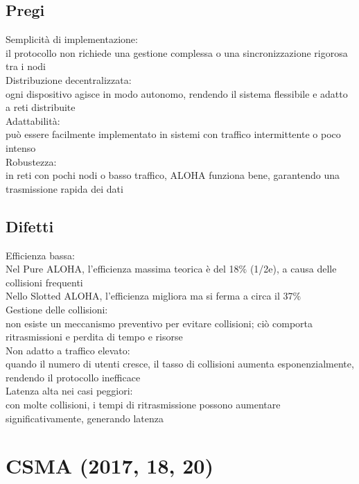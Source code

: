 \documentclass[10pt,oneside,a4paper]{article}
\begin{document}
\subsection{Pregi}
Semplicità di implementazione:\\
il protocollo non richiede una gestione complessa o una sincronizzazione rigorosa tra i nodi\\
Distribuzione decentralizzata:\\
ogni dispositivo agisce in modo autonomo, rendendo il sistema flessibile e adatto a reti distribuite\\
Adattabilità:\\
può essere facilmente implementato in sistemi con traffico intermittente o poco intenso\\
Robustezza:\\
in reti con pochi nodi o basso traffico, ALOHA funziona bene, garantendo una trasmissione rapida dei dati
\subsection{Difetti}
Efficienza bassa:\\
Nel Pure ALOHA, l'efficienza massima teorica è del 18$\%$ (1/2e), a causa delle collisioni frequenti\\
Nello Slotted ALOHA, l'efficienza migliora ma si ferma a circa il 37$\%$\\
Gestione delle collisioni:\\
non esiste un meccanismo preventivo per evitare collisioni; ciò comporta ritrasmissioni e perdita di tempo e risorse\\
Non adatto a traffico elevato:\\
quando il numero di utenti cresce, il tasso di collisioni aumenta esponenzialmente, rendendo il protocollo inefficace\\
Latenza alta nei casi peggiori:\\
con molte collisioni, i tempi di ritrasmissione possono aumentare significativamente, generando latenza
\section{CSMA (2017, 18, 20)}
\end{document}
